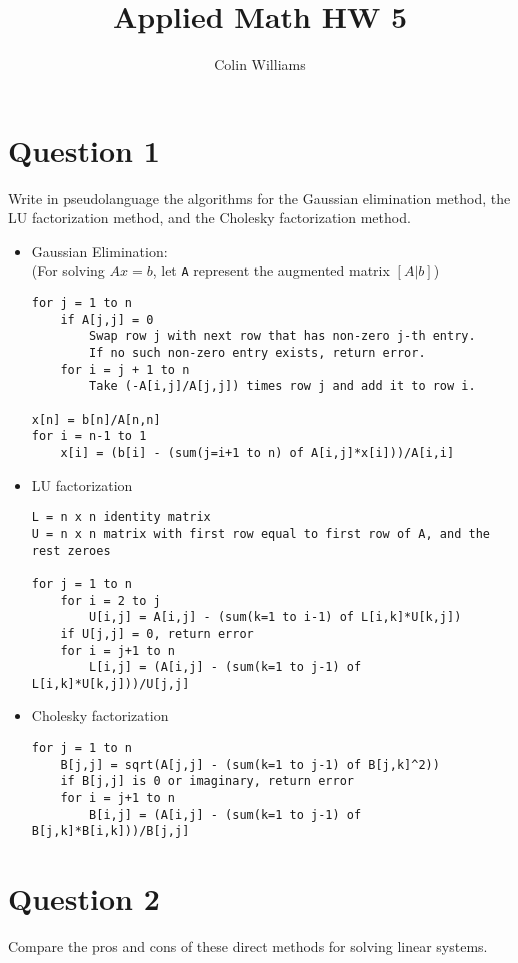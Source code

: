 \documentclass[10pt,a4paper]{article}
\title{Applied Math HW 5}
\author{Colin Williams}
\theoremstyle{definition}
\theoremstyle{definition}
\numberwithin{equation}{section}
\begin{document}
\maketitle

\section*{Question 1}
Write in pseudolanguage the algorithms for the Gaussian elimination method, the LU
factorization method, and the Cholesky factorization method.

\begin{itemize}
\item Gaussian Elimination:
\\(For solving $Ax = b$, let \verb!A! represent the augmented matrix $[A|b]$)
\begin{verbatim}
for j = 1 to n
    if A[j,j] = 0
        Swap row j with next row that has non-zero j-th entry.
        If no such non-zero entry exists, return error.
    for i = j + 1 to n
        Take (-A[i,j]/A[j,j]) times row j and add it to row i.

x[n] = b[n]/A[n,n]
for i = n-1 to 1
    x[i] = (b[i] - (sum(j=i+1 to n) of A[i,j]*x[i]))/A[i,i]
\end{verbatim}
\item LU factorization
\begin{verbatim}
L = n x n identity matrix
U = n x n matrix with first row equal to first row of A, and the rest zeroes

for j = 1 to n
    for i = 2 to j
        U[i,j] = A[i,j] - (sum(k=1 to i-1) of L[i,k]*U[k,j])
    if U[j,j] = 0, return error
    for i = j+1 to n
        L[i,j] = (A[i,j] - (sum(k=1 to j-1) of L[i,k]*U[k,j]))/U[j,j]
\end{verbatim}
\item Cholesky factorization
\begin{verbatim}
for j = 1 to n
    B[j,j] = sqrt(A[j,j] - (sum(k=1 to j-1) of B[j,k]^2))
    if B[j,j] is 0 or imaginary, return error
    for i = j+1 to n
        B[i,j] = (A[i,j] - (sum(k=1 to j-1) of B[j,k]*B[i,k]))/B[j,j]
\end{verbatim}
\end{itemize}

\section*{Question 2}
Compare the pros and cons of these direct methods for solving linear systems.
\end{document}
